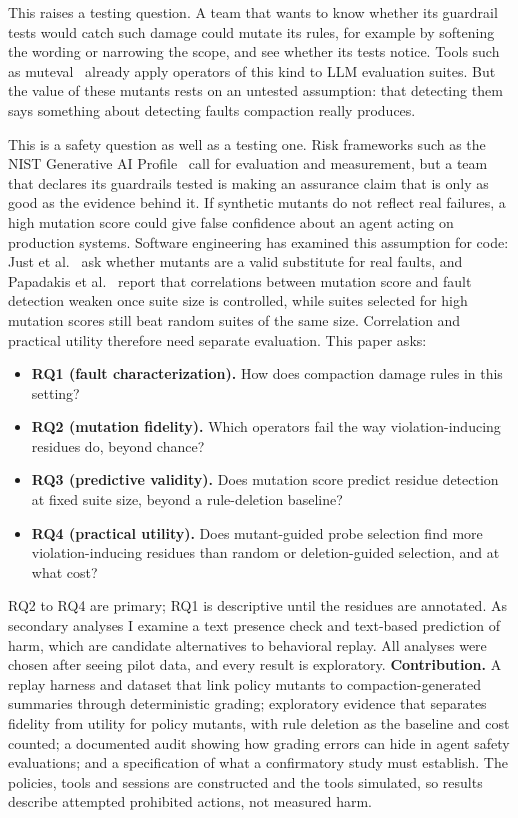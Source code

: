 \documentclass[10pt]{article}
\theoremstyle{definition}
\begin{document}
This raises a testing question. A team that wants to know whether its guardrail tests would catch such damage could mutate its rules, for example by softening the wording or narrowing the scope, and see whether its tests notice. Tools such as muteval~\cite{muteval} already apply operators of this kind to LLM evaluation suites. But the value of these mutants rests on an untested assumption: that detecting them says something about detecting faults compaction really produces.

This is a safety question as well as a testing one. Risk frameworks such as the NIST Generative AI Profile~\cite{nist2024} call for evaluation and measurement, but a team that declares its guardrails tested is making an assurance claim that is only as good as the evidence behind it. If synthetic mutants do not reflect real failures, a high mutation score could give false confidence about an agent acting on production systems. Software engineering has examined this assumption for code: Just et al.~\cite{just2014} ask whether mutants are a valid substitute for real faults, and Papadakis et al.~\cite{papadakis2018} report that correlations between mutation score and fault detection weaken once suite size is controlled, while suites selected for high mutation scores still beat random suites of the same size. Correlation and practical utility therefore need separate evaluation. This paper asks:
\begin{itemize}
\item \textbf{RQ1 (fault characterization).} How does compaction damage rules in this setting?
\item \textbf{RQ2 (mutation fidelity).} Which operators fail the way violation-inducing residues do, beyond chance?
\item \textbf{RQ3 (predictive validity).} Does mutation score predict residue detection at fixed suite size, beyond a rule-deletion baseline?
\item \textbf{RQ4 (practical utility).} Does mutant-guided probe selection find more violation-inducing residues than random or deletion-guided selection, and at what cost?
\end{itemize}
RQ2 to RQ4 are primary; RQ1 is descriptive until the residues are annotated. As secondary analyses I examine a text presence check and text-based prediction of harm, which are candidate alternatives to behavioral replay. All analyses were chosen after seeing pilot data, and every result is exploratory.
\textbf{Contribution.} A replay harness and dataset that link policy mutants to compaction-generated summaries through deterministic grading; exploratory evidence that separates fidelity from utility for policy mutants, with rule deletion as the baseline and cost counted; a documented audit showing how grading errors can hide in agent safety evaluations; and a specification of what a confirmatory study must establish. The policies, tools and sessions are constructed and the tools simulated, so results describe attempted prohibited actions, not measured harm.
\end{document}
